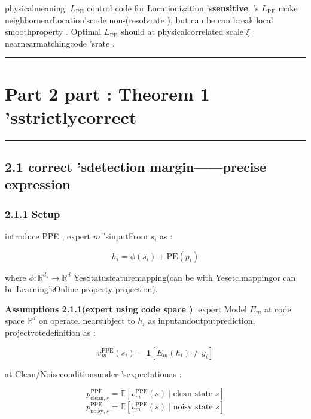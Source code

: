 \documentclass[
  12pt,
]{article}
\begin{document}
physicalmeaning: \(L_{\text{PE}}\) control code for Locationization 's\textbf{sensitive}. 's
\(L_{\text{PE}}\)
make neighbornearLocation'scode non-(resolvrate ), but can be can break local smoothproperty . Optimal
\(L_{\text{PE}}\) should at physicalcorrelated scale  \(\xi\) nearnearmatchingcode 'srate . 

\begin{center}\rule{0.5\linewidth}{0.5pt}\end{center}

\section{Part 2 part : Theorem 1
'sstrictlycorrect }\label{ux7b2c-2-ux90e8ux5206theorem-1-ux7684ux4e25ux683cux4feeux6b63}

\begin{center}\rule{0.5\linewidth}{0.5pt}\end{center}

\subsection{2.1
correct 'sdetection margin------precise expression }\label{ux4feeux6b63ux7684ux68c0ux6d4bux8fb9ux9645ux7cbeux786eux8868ux8fbeux5f0f}

\subsubsection{2.1.1 Setup}\label{ux8bbeux5b9a}

introduce  PPE , expert  \(m\) 'sinputFrom \(s_i\) as : 

\[h_i = \phi(s_i) + \text{PE}(p_i)\]

where \(\phi: \mathbb{R}^{d_s} \to \mathbb{R}^d\)
YesStatusfeaturemapping(can be with Yesetc.mappingor can be Learning'sOnline property projection). 

\textbf{Assumptions 2.1.1(expert using code space )}: expert Model \(E_m\) at code space 
\(\mathbb{R}^d\) on operate. nearsubject to \(h_i\)
as inputandoutputprediction, projectvotedefinition as : 

\[v_m^{\text{PPE}}(s_i) = \mathbf{1}[E_m(h_i) \neq y_i]\]

at Clean/Noiseconditionsunder 'sexpectationas : 

\[p_{\text{clean}, s}^{\text{PPE}} = \mathbb{E}[v_m^{\text{PPE}}(s) \mid \text{clean state } s]\]
\[p_{\text{noisy}, s}^{\text{PPE}} = \mathbb{E}[v_m^{\text{PPE}}(s) \mid \text{noisy state } s]\]
\end{document}
